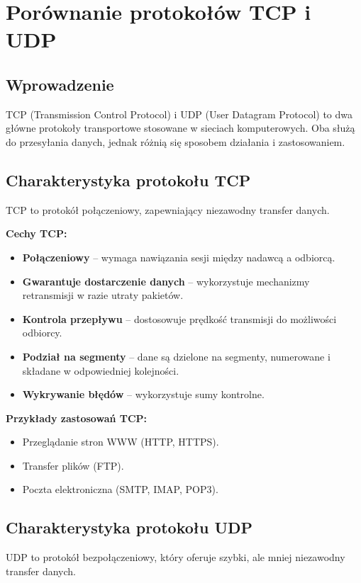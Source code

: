 \section{Porównanie protokołów TCP i UDP}

\subsection{Wprowadzenie}
TCP (Transmission Control Protocol) i UDP (User Datagram Protocol) to dwa główne protokoły transportowe stosowane w sieciach komputerowych. Oba służą do przesyłania danych, jednak różnią się sposobem działania i zastosowaniem.

\subsection{Charakterystyka protokołu TCP}
TCP to protokół połączeniowy, zapewniający niezawodny transfer danych.

\textbf{Cechy TCP:}
\begin{itemize}
    \item \textbf{Połączeniowy} – wymaga nawiązania sesji między nadawcą a odbiorcą.
    \item \textbf{Gwarantuje dostarczenie danych} – wykorzystuje mechanizmy retransmisji w razie utraty pakietów.
    \item \textbf{Kontrola przepływu} – dostosowuje prędkość transmisji do możliwości odbiorcy.
    \item \textbf{Podział na segmenty} – dane są dzielone na segmenty, numerowane i składane w odpowiedniej kolejności.
    \item \textbf{Wykrywanie błędów} – wykorzystuje sumy kontrolne.
\end{itemize}

\textbf{Przykłady zastosowań TCP:}
\begin{itemize}
    \item Przeglądanie stron WWW (HTTP, HTTPS).
    \item Transfer plików (FTP).
    \item Poczta elektroniczna (SMTP, IMAP, POP3).
\end{itemize}

\subsection{Charakterystyka protokołu UDP}
UDP to protokół bezpołączeniowy, który oferuje szybki, ale mniej niezawodny transfer danych.

